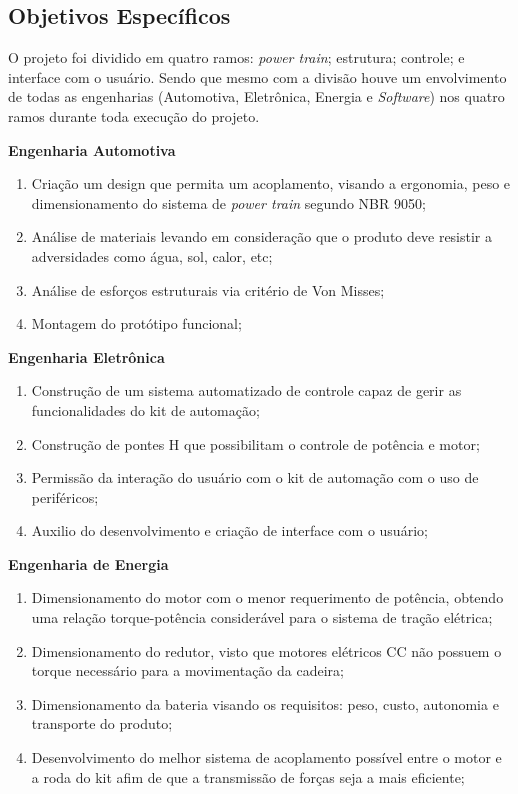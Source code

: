 \subsection{Objetivos Específicos}

O projeto foi dividido em quatro ramos: \textit{power train}; estrutura; controle; e interface com o usuário. Sendo que mesmo com a divisão houve um envolvimento de todas as engenharias (Automotiva, Eletrônica, Energia e \textit{Software}) nos quatro ramos durante toda execução do projeto.

\textbf{Engenharia Automotiva}

  \begin{enumerate}
    \item Criação um design que permita um acoplamento, visando a ergonomia, peso e dimensionamento do sistema de \textit{power train} segundo NBR 9050;
    \item Análise de materiais levando em consideração que o produto deve resistir a adversidades como água, sol, calor, etc;
    \item Análise de esforços estruturais via critério de Von Misses;
    \item Montagem do protótipo funcional;
  \end{enumerate}

\textbf{Engenharia Eletrônica}
  \begin{enumerate}
    \item Construção de um sistema automatizado de controle capaz de gerir as funcionalidades do kit de automação;
    \item Construção de pontes H que possibilitam o controle de potência e motor;
    \item Permissão da interação do usuário com o kit de automação com o uso de periféricos;
    \item Auxilio do desenvolvimento e criação de interface com o usuário;
  \end{enumerate}

\textbf{Engenharia de Energia}
  \begin{enumerate}
    \item Dimensionamento do motor com o menor requerimento de potência, obtendo uma relação torque-potência considerável para o sistema de tração elétrica;
    \item Dimensionamento do redutor, visto que motores elétricos CC não possuem o torque necessário para a movimentação da cadeira;
    \item Dimensionamento da bateria visando os requisitos: peso, custo, autonomia e transporte do produto;
    \item Desenvolvimento do melhor sistema de acoplamento possível entre o motor e a roda do kit afim de que a transmissão de forças seja a mais eficiente;
  \end{enumerate}

